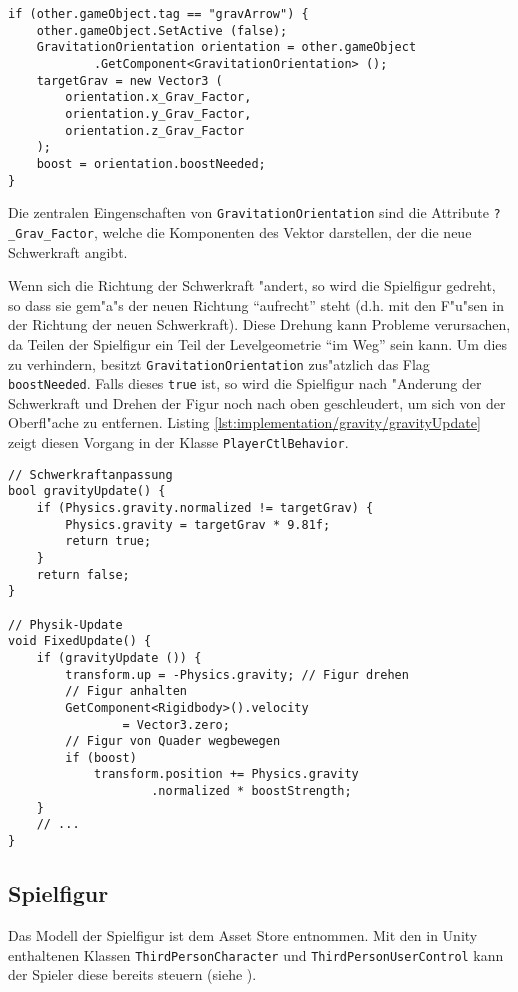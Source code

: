 \begin{lstlisting}[caption={Kollision mit Schwerkraftpfeil},label=lst:implementation/gravity/OnTriggerEnter]
if (other.gameObject.tag == "gravArrow") {
    other.gameObject.SetActive (false);
    GravitationOrientation orientation = other.gameObject
            .GetComponent<GravitationOrientation> ();
    targetGrav = new Vector3 (
        orientation.x_Grav_Factor,
        orientation.y_Grav_Factor,
        orientation.z_Grav_Factor
    );
    boost = orientation.boostNeeded;
}
\end{lstlisting}

Die zentralen Eingenschaften von \texttt{GravitationOrientation} sind
die Attribute \texttt{?\_Grav\_Factor}, welche die Komponenten des Vektor darstellen,
der die neue Schwerkraft angibt.

Wenn sich die Richtung der Schwerkraft "andert, so wird die Spielfigur
gedreht, so dass sie gem"a"s der neuen Richtung ``aufrecht'' steht
(d.h. mit den F"u"sen in der Richtung der neuen Schwerkraft). Diese
Drehung kann Probleme verursachen, da Teilen der Spielfigur ein Teil
der Levelgeometrie ``im Weg'' sein kann. Um dies zu verhindern, besitzt
\texttt{GravitationOrientation} zus"atzlich das Flag \texttt{boostNeeded}.
Falls dieses \texttt{true} ist, so wird die Spielfigur nach "Anderung
der Schwerkraft und Drehen der Figur noch nach oben geschleudert, um
sich von der Oberfl"ache zu entfernen. Listing
\ref{lst:implementation/gravity/gravityUpdate} zeigt diesen Vorgang
in der Klasse \texttt{PlayerCtlBehavior}.

\begin{lstlisting}[caption={Anpassung der Schwerkraft und Spielfigur},label=lst:implementation/gravity/gravityUpdate]
// Schwerkraftanpassung
bool gravityUpdate() {
    if (Physics.gravity.normalized != targetGrav) {
        Physics.gravity = targetGrav * 9.81f;
        return true;
    }
    return false;
}

// Physik-Update
void FixedUpdate() {
    if (gravityUpdate ()) {
        transform.up = -Physics.gravity; // Figur drehen
        // Figur anhalten
        GetComponent<Rigidbody>().velocity
                = Vector3.zero;
        // Figur von Quader wegbewegen
        if (boost)
            transform.position += Physics.gravity
                    .normalized * boostStrength;
    }
    // ...
}
\end{lstlisting}
%
\subsection{Spielfigur}
\label{sec:implementation/avatar}
Das Modell der Spielfigur ist dem Asset Store entnommen.
Mit den in Unity enthaltenen Klassen \texttt{ThirdPersonCharacter}
und \texttt{ThirdPersonUserControl} kann der Spieler diese
bereits steuern (siehe ).

